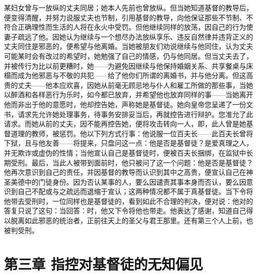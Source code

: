 某妇女曾与一放纵的丈夫同居；她本人先前也曾放纵。但当她知道基督的教导后，便变得清醒，并努力说服丈夫也节制，引用基督的教导，向他保证那些不节制、不符合正确理性而生活的人将在永火中受罚。但他继续同样的放荡，因自己的行为使妻子疏远了他。因她认为继续与一个想尽办法放纵享乐、违反自然律并违背正义的丈夫同住是邪恶的，便希望与他离婚。当她被朋友们劝说继续与他同住，认为丈夫可能某时会有改过的希望时，她勉强了自己的情感，仍与他同居。但当丈夫去了，并被传行为比以前更糟时，她——为避免因继续与他保持婚姻关系、共享餐桌与床榻而成为他邪恶与不敬的共犯——给了他你们所谓的离婚书，并与他分离。但这高贵的丈夫——他本应欢喜，因她从前毫无顾忌地与仆人和雇工所做的那些事，当她以醉酒和各样恶行为乐时，如今都已放弃，并希望他也放弃同样的事——当她离开他而非出于他的意愿时，他却控告她，声称她是基督徒。她向皇帝您呈递了一份文书，请求先允许她处理事务，待事务安排妥当后，再就控告进行辩护。您准允了此请求。而她从前的丈夫，因不能再控告她，便将攻击转向一人，即，此人曾是她基督道理的教师，被惩罚。他以下列方式行事：他说服一位百夫长——此百夫长曾将下狱，且与他友善——将提来，只盘问这一点：他是否是基督徒？是爱真理之人，并无欺诈或虚伪的性情；当他宣认自己是基督徒时，便被百夫长捆绑，在监狱中长期受刑。最后，当此人被带到面前时，他只被问了这一个问题：他是否是基督徒？他再次意识到自己的责任，并因基督的教导而认识到其中之高贵，便宣认自己在神圣美德中的门徒身份。因为否认某事的人，要么因谴责其事本身而否认，要么因意识到自己不配或与之疏远而退缩于宣认；这两种情况都不属于真基督徒。当下令将他带去受刑时，一位同样也是基督徒的，看到如此不合理的判决，便对说：他对的答复只说了这句：当回答：时，他又下令将他也带走。他表达了感谢，知道自己得以脱离如此邪恶的统治者，正前往天上的圣父与君王那里。还有第三个人上前，也被判受刑。\par


\section{第三章 指控对基督徒的无知偏见}

